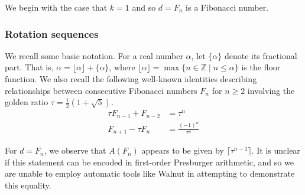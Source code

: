 \documentclass[10pt,a4paper,reqno]{amsart}
\newcommand{\Z}{{\mathbb Z}}
\newcommand{\walnut}{{\ttfamily Walnut}}
\begin{document}
We begin with the case that $k=1$ and so $d=F_n$ is a Fibonacci number.

\subsubsection{Rotation sequences}
We recall some basic notation. For a real number $\alpha$, let $\{ \alpha\}$ denote its fractional part. That is, $\alpha=\lfloor \alpha \rfloor + \{ \alpha\}$, where $\lfloor\alpha\rfloor = \max\{n \in \Z \mid n\leq \alpha\}$ is the floor function. We also recall the following well-known identities describing relationships between consecutive Fibonacci numbers $F_n$ for $n\geq2$ involving the golden ratio $\tau = \frac{1}{2}(1+\sqrt{5})$.
\begin{align}
    \tau F_{n-1}+F_{n-2}&=\tau^n\label{aedoequi}\\
    F_{n+1}-\tau F_{n}& = \frac{(-1)^n}{\tau^n}\label{EQ:fibfraclim}
\end{align}

For $d=F_n$, we observe that $A(F_n)$ appears to be given by $\lceil \tau^{n-1} \rceil$.
It is unclear if this statement can be encoded in first-order Presburger arithmetic, and so we are unable to employ automatic tools like \walnut{} in attempting to demonstrate this equality.
\end{document}
